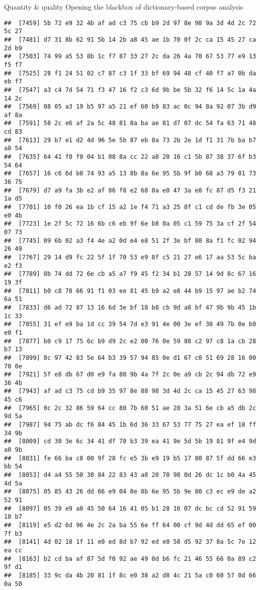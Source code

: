 \documentclass[
  ignorenonframetext,
]{beamer}
\begin{document}
\begin{frame}[fragile]{Quantity \& quality \textbar{} Opening the
blackbox of dictionary-based corpus analysis}
\begin{verbatim}
##  [7459] 5b 72 e9 32 4b af ad c3 75 cb b9 2d 97 8e 98 9a 3d 4d 2c 72 5c 27
##  [7481] d7 31 8b 62 91 5b 14 2b a8 45 ae 1b 70 0f 2c ca 15 45 27 ca 2d b9
##  [7503] 74 99 a5 53 8b 1c f7 87 33 27 2c da 26 4a 70 67 53 77 e9 13 f5 f7
##  [7525] 28 f1 24 51 02 c7 87 c3 1f 33 bf 69 94 48 cf 40 f7 a7 0b da eb f7
##  [7547] a3 c4 7d 54 71 f3 47 16 f2 c3 6d 9b be 5b 32 f6 14 5c 1a 4a 14 2c
##  [7569] 08 05 a3 19 b5 97 a5 21 ef 60 b9 83 ac 0c 94 8a 92 07 3b d9 af 8a
##  [7591] 58 2c e6 af 2a 5c 48 81 8a ba ae 81 d7 07 dc 54 fa 63 71 48 cd 83
##  [7613] 29 b7 e1 d2 4d 96 5e 5b 87 eb 8a 73 2b 2e 1d f1 31 7b ba b7 a8 54
##  [7635] 64 41 f0 f0 04 b1 08 8a cc 22 a8 20 16 c1 5b 87 38 37 6f b3 54 64
##  [7657] 16 c6 6d b8 74 93 a5 13 8b 8a 6e 95 5b 9f b0 68 a3 79 01 73 36 75
##  [7679] d7 a9 fa 3b e2 af 86 f8 e2 68 0a e0 47 3a e8 fc 87 d5 f3 21 1a d5
##  [7701] 10 f0 26 ea 1b cf 15 a2 1e f4 71 a3 25 8f c1 cd de fb 3e 05 e0 4b
##  [7723] 1e 2f 5c 72 16 6b c6 eb 9f 6e b8 0a 05 c1 59 75 3a cf 2f 54 07 73
##  [7745] 09 6b 02 a3 f4 4e a2 0d e4 e8 51 2f 3e bf 80 8a f1 fc 02 94 26 49
##  [7767] 29 14 d9 fc 22 5f 1f 70 53 e9 8f c5 21 27 e6 17 aa 53 5c ba e2 f3
##  [7789] 8b 74 dd 72 6e cb a5 a7 f9 45 f2 34 b1 28 57 14 9d 8c 67 16 19 3f
##  [7811] b0 c8 78 66 91 f1 03 ee 81 45 b9 a2 e8 44 b9 15 97 ae b2 74 6a 51
##  [7833] d6 ad 72 87 13 16 6d 3e bf 18 b8 cb 9d a8 bf 47 9b 9b 45 1b 1c 33
##  [7855] 31 ef e9 ba 1d cc 39 54 7d e3 91 4e 00 3e ef 38 49 7b 0e b0 e0 f1
##  [7877] b0 c9 17 75 6c b9 d9 2c e2 00 76 0e 59 80 c2 97 c8 1a cb 28 b7 13
##  [7899] 8c 97 42 83 5e 64 b3 39 57 94 85 0e d1 67 c0 51 69 28 16 00 70 0e
##  [7921] 5f e8 db 67 d0 e9 fa 80 9b 4a 7f 2c 0e a9 cb 2c 94 db 72 e9 36 4b
##  [7943] af ad c3 75 cd b9 35 97 8e 88 98 3d 4d 2c ca 15 45 27 63 98 45 c6
##  [7965] 0c 2c 32 86 59 64 cc 80 7b 60 51 ae 28 3a 51 6e cb a5 db 2c 9d 5a
##  [7987] 94 75 ab dc f6 84 45 1b 6d 36 33 67 53 77 75 27 ea ef 18 ff 34 9b
##  [8009] cd 30 3e 6c 34 41 df 78 b3 39 ea 41 9e 5d 5b 19 81 9f e4 9d a0 9b
##  [8031] fe 66 ba c8 00 9f 28 fc e5 3b e9 19 b5 17 80 87 5f dd 66 e3 bb 54
##  [8053] d4 a4 55 50 38 84 22 83 43 a8 20 70 98 0d 26 dc 1c b0 4a 45 4d 5a
##  [8075] 05 85 43 26 dd 66 e9 04 0e 8b 6e 95 5b 9e 80 c3 ec e9 de a2 52 91
##  [8097] 05 39 e9 a8 45 50 64 16 41 05 b1 28 16 07 dc bc cd 52 91 59 18 b7
##  [8119] e5 d2 6d 96 4e 2c 2a ba 55 6e ff 64 00 cf 9d 4d dd 65 ef 00 7f b3
##  [8141] 4d 02 18 1f 11 e0 ed 8d b7 92 ed e0 58 d5 92 37 8a 5c 7e 12 ea cc
##  [8163] b2 cd ba af 87 5d f0 92 ae 49 0d b6 fc 21 46 55 66 0a 89 c2 9f d1
##  [8185] 33 9c da 4b 20 81 1f 8c e0 38 a2 d8 4c 21 5a c0 60 57 0d 66 0a 50

\end{verbatim}
\end{frame}
\end{document}
